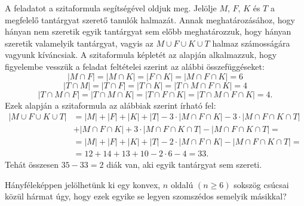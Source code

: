 \begin{solution}
A feladatot a szitaformula segítségével oldjuk meg. Jelölje $M$,
$F$, $K$ és $T$ a megfelelő tantárgyat szerető tanulók halmazát.
Annak meghatározásához, hogy hányan nem szeretik egyik tantárgyat
sem előbb meghatározzuk, hogy hányan szeretik valamelyik tantárgyat,
vagyis az $M\cup F\cup K\cup T$ halmaz számosságára vagyunk kíváncsiak.
A szitaformula képletét az alapján alkalmazzuk, hogy figyelembe vesszük
a feladat feltételei szerint az alábbi összefüggéseket: 
\[
|M\cap F|=|M\cap K|=|F\cap K|=|M\cap F\cap K|=6
\]
\[
|T\cap M|=|T\cap F|=|T\cap K|=|T\cap M\cap F\cap K|=4
\]
\[
|T\cap M\cap F|=|T\cap M\cap K|=|T\cap F\cap K|=|T\cap M\cap F\cap K|=4.
\]
Ezek alapján a szitaformula az alábbiak szerint írható fel: 
\begin{align*}
|M\cup F\cup K\cup T| & =|M|+|F|+|K|+|T|-3\cdot|M\cap F\cap K|-3\cdot|M\cap F\cap K\cap T|\\
 & +|M\cap F\cap K|+3\cdot|M\cap F\cap K\cap T|-|M\cap F\cap K\cap T|=\\
 & =|M|+|F|+|K|+|T|-2\cdot|M\cap F\cap K|-|M\cap F\cap K\cap T|=\\
 & =12+14+13+10-2\cdot6-4=33.
\end{align*}
Tehát összesen $35-33=2$ diák van, aki egyik tantárgyat sem szereti. 
\end{solution}
\begin{extraproblem}
Hányféleképpen jelölhetünk ki egy konvex, $n$ oldalú $(n\geq6)$
sokszög csúcsai közül hármat úgy, hogy ezek egyike se legyen szomszédos
semelyik másikkal? 
\end{extraproblem}

